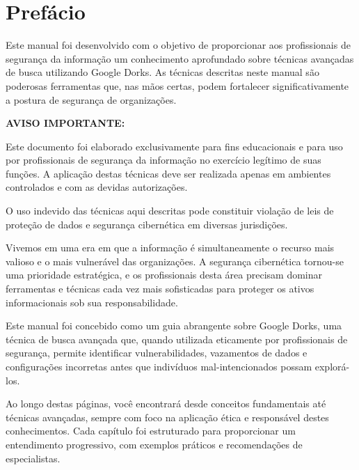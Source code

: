 \documentclass[12pt,a4paper]{book}
\begin{document}
\tableofcontents
\newpage

\chapter*{Prefácio}

\begin{tcolorbox}[colback=azulseguranca!10!white, colframe=azulseguranca, title={\textbf{\large SOBRE ESTE MANUAL}}]
Este manual foi desenvolvido com o objetivo de proporcionar aos profissionais de segurança da informação um conhecimento aprofundado sobre técnicas avançadas de busca utilizando Google Dorks. As técnicas descritas neste manual são poderosas ferramentas que, nas mãos certas, podem fortalecer significativamente a postura de segurança de organizações.

\vspace{0.5cm}
\textbf{\large{\color{vermelhoperigo}AVISO IMPORTANTE:}}

Este documento foi elaborado exclusivamente para fins educacionais e para uso por profissionais de segurança da informação no exercício legítimo de suas funções. A aplicação destas técnicas deve ser realizada apenas em ambientes controlados e com as devidas autorizações.

O uso indevido das técnicas aqui descritas pode constituir violação de leis de proteção de dados e segurança cibernética em diversas jurisdições.
\end{tcolorbox}

\vspace{1cm}

Vivemos em uma era em que a informação é simultaneamente o recurso mais valioso e o mais vulnerável das organizações. A segurança cibernética tornou-se uma prioridade estratégica, e os profissionais desta área precisam dominar ferramentas e técnicas cada vez mais sofisticadas para proteger os ativos informacionais sob sua responsabilidade.

Este manual foi concebido como um guia abrangente sobre Google Dorks, uma técnica de busca avançada que, quando utilizada eticamente por profissionais de segurança, permite identificar vulnerabilidades, vazamentos de dados e configurações incorretas antes que indivíduos mal-intencionados possam explorá-los.

Ao longo destas páginas, você encontrará desde conceitos fundamentais até técnicas avançadas, sempre com foco na aplicação ética e responsável destes conhecimentos. Cada capítulo foi estruturado para proporcionar um entendimento progressivo, com exemplos práticos e recomendações de especialistas.
\end{document}
